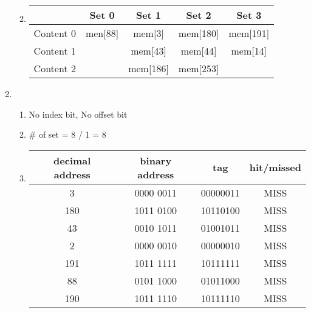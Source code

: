 \documentclass{article}
\begin{document}
\begin{enumerate}[1)]
\begin{enumerate}
\begin{center}
                \end{center}
            \item 
                \begin{center}
                    \begin{tabular}{ |c|c|c|c|c| }
                     \hline
                     & Set 0 & Set 1 & Set 2 & Set 3 \\
                     \hline
                     Content 0 & men[88] & mem[3] & mem[180] & mem[191] \\
                     \hline
                     Content 1 & & mem[43] & mem[44] & mem[14] \\
                     \hline
                     Content 2 & & mem[186] & mem[253] & \\
                     \hline
                    \end{tabular}
                \end{center}
        \end{enumerate}
    \item 
        \begin{enumerate}
            \item No index bit, No offset bit
            \item \# of set = 8 / 1 = 8
            \item 
                \begin{center}
                    \begin{tabular}{ |c|c|c|c| }
                     \hline
                     decimal address & binary address & tag & hit/missed \\
                     \hline
                     3 & 0000 0011 & 00000011 & MISS \\  
                     \hline
                     180 & 1011 0100 & 10110100 & MISS \\
                     \hline
                     43 & 0010 1011 & 01001011 & MISS \\
                     \hline
                     2 & 0000 0010 & 00000010 & MISS \\
                     \hline
                     191 & 1011 1111 & 10111111 & MISS\\
                     \hline
                     88 & 0101 1000 & 01011000 & MISS \\
                     \hline
                     190 & 1011 1110 & 10111110 & MISS \\
                     \hline

\end{tabular}
\end{center}
\end{enumerate}
\end{enumerate}
\end{document}
